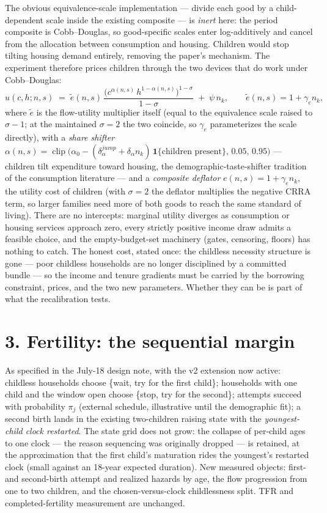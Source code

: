 \documentclass[11pt]{article}
\begin{document}
The obvious equivalence-scale implementation --- divide each good by a
child-dependent scale inside the existing composite --- is \emph{inert}
here: the period composite is Cobb--Douglas, so good-specific scales enter
log-additively and cancel from the allocation between consumption and
housing. Children would stop tilting housing demand entirely, removing the
paper's mechanism. The experiment therefore prices children through the two
devices that do work under Cobb--Douglas:
\[
u(c,h;n,s) \;=\; \tilde e(n,s)\,
\frac{\bigl(c^{\alpha(n,s)}\,h^{1-\alpha(n,s)}\bigr)^{1-\sigma}}{1-\sigma}
\;+\;\psi\,n_k,
\qquad \tilde e(n,s) = 1+\gamma_e n_k,
\]
where $\tilde e$ is the flow-utility multiplier itself (equal to the
equivalence scale raised to $\sigma-1$; at the maintained $\sigma=2$ the two
coincide, so $\gamma_e$ parameterizes the scale directly),
with a \emph{share shifter}
$\alpha(n,s)=\operatorname{clip}\!\bigl(\alpha_0-(\delta_\alpha^{jump}+
\delta_\alpha n_k)\,\mathbf{1}\{\text{children present}\},\,0.05,\,0.95\bigr)$
--- children tilt expenditure toward housing, the demographic-taste-shifter
tradition of the consumption literature --- and a \emph{composite deflator}
$e(n,s)=1+\gamma_e n_k$, the utility cost of children (with $\sigma=2$ the
deflator multiplies the negative CRRA term, so larger families need more of
both goods to reach the same standard of living). There are no intercepts:
marginal utility diverges as consumption or housing services approach zero,
every strictly positive income draw admits a feasible choice, and the
empty-budget-set machinery (gates, censoring, floors) has nothing to catch.
The honest cost, stated once: the childless necessity structure is gone ---
poor childless households are no longer disciplined by a committed bundle
--- so the income and tenure gradients must be carried by the borrowing
constraint, prices, and the two new parameters. Whether they can be is part
of what the recalibration tests.

\section*{3. Fertility: the sequential margin}

As specified in the July-18 design note, with the v2 extension now active:
childless households choose \{wait, try for the first child\}; households
with one child and the window open choose \{stop, try for the second\};
attempts succeed with probability $\pi_j$ (external schedule, illustrative
until the demographic fit); a second birth lands in the existing
two-children raising state with the \emph{youngest-child clock restarted}.
The state grid does not grow: the collapse of per-child ages to one clock
--- the reason sequencing was originally dropped --- is retained, at the
approximation that the first child's maturation rides the youngest's
restarted clock (small against an 18-year expected duration). New measured
objects: first- and second-birth attempt and realized hazards by age, the
flow progression from one to two children, and the chosen-versus-clock
childlessness split. TFR and completed-fertility measurement are unchanged.
\end{document}

